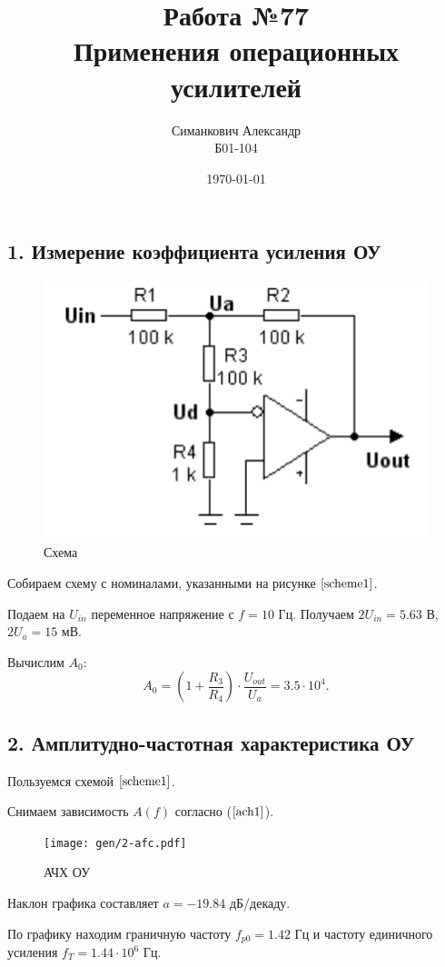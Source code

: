 \documentclass[12pt,a4paper]{article}
\title{Работа №77\\ Применения операционных усилителей}
\author{Симанкович Александр \\ Б01-104}
\date{\today}
\begin{document}
	\maketitle	
	
	\subsection*{1. Измерение коэффициента усиления ОУ}

	\begin{figure}[H]
		\centering
		\includegraphics[width=0.5\linewidth]{res/1.png}
		\caption{Схема}
		\label{scheme1}
	\end{figure}

	Собираем схему с номиналами, указанными на рисунке $\ref{scheme1}$.
	
	Подаем на $U_{in}$ переменное напряжение с $f = 10$ Гц. Получаем $2U_{in} = 5.63$ В, $2U_a = 15$ мВ.
	
	Вычислим $A_0$:
	\begin{equation}
		A_0 = (1 + \frac{R_3}{R_4}) \cdot \frac{U_{out}}{U_a} = 3.5 \cdot 10^4.
		\label{ach1}
	\end{equation}
	
	\subsection*{2. Амплитудно-частотная характеристика ОУ}
	
	Пользуемся схемой $\ref{scheme1}$.
	
	Снимаем зависимость $A(f)$ согласно ($\ref{ach1}$).
	
	\begin{figure}[H]
		\centering
		\texttt{[image: gen/2-afc.pdf]}
		\caption{АЧХ ОУ}
		\label{ach2}
	\end{figure}
	
	Наклон графика составляет $a = -19.84$ дБ/декаду.

	По графику находим граничную частоту $f_{p0} = 1.42$ Гц и частоту единичного усиления $f_T = 1.44 \cdot 10^6$ Гц.
	
\end{document}
